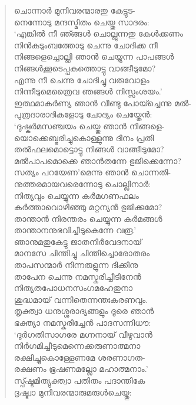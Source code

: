 \begin{verse}
ചൊന്നാര്‍ മുനിവരന്മാരതു കേട്ടുട-\\
നെന്നോടു മന്ദസ്മിതം ചെയ്തു സാദരം:\\
‘എങ്കില്‍ നീ ഞ്ങ്ങള്‍ ചൊല്ലുന്നതു കേള്‍ക്കണം\\
നിന്‍കുടുംബത്തോടു ചെന്നു ചോദിക്ക നീ\\
നിങ്ങളെച്ചൊല്ലി ഞാന്‍ ചെയ്യുന്ന പാപങ്ങള്‍\\
നിങ്ങള്‍ക്കൂടെപ്പകുത്തൊട്ടു വാങ്ങീടുമോ?\\
എന്നു നീ ചെന്നു ചോദിച്ചു വരുവോളം\\
നിന്നീടുമെത്രൈവ ഞങ്ങള്‍ നിസ്സംശയം.’\\
ഇത്ഥമാക‍ര്‍ണ്യ ഞാന്‍ വീണ്ടു പോയ്ച്ചെന്നു മല്‍-\\
പുത്രദാരാദികളോടു ചോദ്യം ചെയ്തേന്‍:\\
‘ദുഷ്കര്‍മസഞ്ചയം ചെയ്തു ഞാന്‍ നിങ്ങളെ-\\
യൊക്കെബ്ഭരിച്ചുകൊള്ളുന്നു ദിനം പ്രതി\\
തല്‍ഫലമൊട്ടൊട്ടു നിങ്ങള്‍ വാങ്ങീടുമോ?\\
മല്‍പാപമൊക്കെ ഞാന്‍തന്നേ ഭുജിക്കെന്നോ?\\
സത്യം പറയേണ’മെന്നു ഞാന്‍ ചൊന്നതി-\\
നുത്തരമായവരെന്നോടു ചൊല്ലിനാര്‍:\\
നിത്യവും ചെയ്യുന്ന കര്‍മഗണഫലം\\
കര്‍ത്താവൊഴിഞ്ഞു മറ്റന്യന്‍ ഭുജിക്കുമോ?\\
താന്താന്‍ നിരന്തരം ചെയ്യുന്ന കര്‍മങ്ങള്‍\\
താന്താനനുഭവിച്ചീടുകെന്നേ വരൂ.’\\
ഞാനുമതുകേട്ടു ജാതനിര്‍വേദനായ്\\
മാനസേ ചിന്തിച്ചു ചിന്തിച്ചൊരോതരം\\
താപസന്മാര്‍ നിന്നരുളുന്ന ദിക്കിനു\\
താപേന ചെന്നു നമസ്കരിച്ചീടിനേന്‍\\
നിത്യതപോധനസംഗമഹേതുനാ\\
ശുദ്ധമായ് വന്നിതെന്നന്തഃകരണവും.\\
തൃക്ത്വാ ധനുശ്ശരാദ്യങ്ങളും ദൂരെ ഞാന്‍\\
ഭക്ത്യാ നമസ്കരിച്ചേന്‍ പാദസന്നിധൗ:\\
‘ദുര്‍ഗതിസാഗരേ മഗ്നനായ് വീഴുവാന്‍\\
നിര്‍ഗമിച്ചീടുമെന്നെക്കരുണാത്മനാ\\
രക്ഷിച്ചുകൊള്ളേണമേ ശരണാഗത-\\
രക്ഷണം ഭൂഷണമല്ലോ മഹാത്മനാം.’\\
സ്പ്ഷ്ടമിത്യുക്ത്വാ പതിതം പദാന്തികേ\\
ദൃഷ്ട്വാ മുനിവരന്മാരുമരുള്‍ചെയ്തു:\\

\end{verse}
